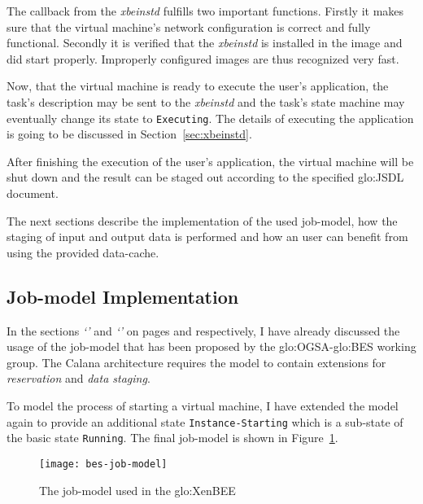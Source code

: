 The callback  from the  \emph{xbeinstd} fulfills two  important functions.
Firstly it makes sure that  the virtual machine's network configuration is
correct  and   fully  functional.   Secondly  it  is   verified  that  the
\emph{xbeinstd}  is  installed  in  the  image  and  did  start  properly.
Improperly configured images are thus recognized very fast.

Now, that the virtual machine  is ready to execute the user's application,
the task's description  may be sent to the  \emph{xbeinstd} and the task's
state machine  may eventually change its state  to \texttt{Executing}. The
details  of  executing  the  application  is  going  to  be  discussed  in
Section~\ref{sec:xbeinstd}.

After  finishing the  execution  of the  user's  application, the  virtual
machine will  be shut down and the  result can be staged  out according to
the specified \gls{glo:JSDL} document.

\bigskip

The next sections  describe the implementation of the  used job-model, how
the staging  of input  and output data  is performed  and how an  user can
benefit from using the provided data-cache.

\subsection{Job-model Implementation}
\label{sec:xbed:job-model}

In     the     sections    \emph{`'}     and
\emph{`'}               on               pages
\pageref{sec:fundamentals:bes}       and      \pageref{sec:calana-support}
respectively, I have already discussed the usage of the job-model that has
been  proposed  by the  \gls{glo:OGSA}-\gls{glo:BES}  working group.   The
Calana  architecture   requires  the  model  to   contain  extensions  for
\emph{reservation} and \emph{data staging}.

To model  the process of starting  a virtual machine, I  have extended the
model  again  to provide  an  additional state  \texttt{Instance-Starting}
which  is a  sub-state  of  the basic  state  \texttt{Running}. The  final
job-model is shown in Figure~\ref{fig:bes-job-model}.

\begin{figure}[ht]
  \centering
  \texttt{[image: bes-job-model]}
  \caption{The job-model used in the \gls{glo:XenBEE}}
  \label{fig:bes-job-model}
\end{figure}

